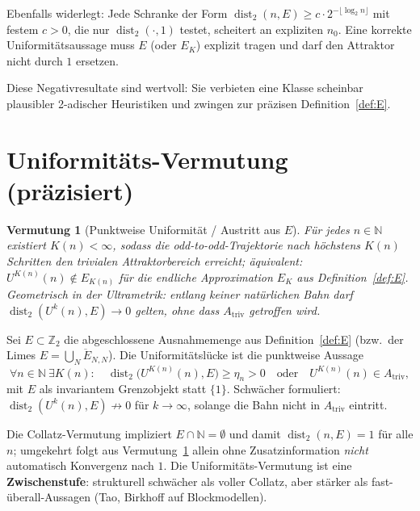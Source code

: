 \documentclass[12pt,a4paper]{article}
\newtheorem{vermutung}[satz]{Vermutung}
\newcommand{\N}{\mathbb{N}}
\newcommand{\Ztwo}{\mathbb{Z}_2}
\newcommand{\disttwo}{\operatorname{dist}_2}
\begin{document}
\begin{tcolorbox}[bewiesen,title={Widerlegte $c\cdot 2^{-\log n}$-Form}]
Ebenfalls widerlegt: Jede Schranke der Form
$\disttwo(n,E)\geq c\cdot 2^{-\lfloor\log_2 n\rfloor}$ mit festem $c>0$,
die nur $\disttwo(\cdot,1)$ testet, scheitert an expliziten $n_0$.
Eine korrekte Uniformit\"atsaussage muss $E$ (oder $E_K$) explizit tragen
und darf den Attraktor nicht durch $1$ ersetzen.
\end{tcolorbox}

Diese Negativresultate sind wertvoll: Sie verbieten eine Klasse scheinbar
plausibler 2-adischer Heuristiken und zwingen zur pr\"azisen Definition~\ref{def:E}.

\section{Uniformit\"ats-Vermutung (pr\"azisiert)}
\label{sec:uniform}

\begin{vermutung}[Punktweise Uniformit\"at / Austritt aus $E$]
\label{verm:uniform}
F\"ur jedes $n\in\N$ existiert $K(n)<\infty$, sodass die odd-to-odd-Trajektorie
nach h\"ochstens $K(n)$ Schritten den trivialen Attraktorbereich erreicht;
\"aquivalent: $U^{K(n)}(n)\notin E_{K(n)}$ f\"ur die endliche Approximation
$E_K$ aus Definition~\ref{def:E}.
Geometrisch in der Ultrametrik: entlang keiner nat\"urlichen Bahn darf
$\disttwo(U^k(n),E)\to 0$ gelten, ohne dass $A_{\mathrm{triv}}$ getroffen wird.
\end{vermutung}

\begin{tcolorbox}[offen,title={Pr\"azise offene Frage (geometrisch)}]
Sei $E\subset\Ztwo$ die abgeschlossene Ausnahmemenge aus Definition~\ref{def:E}
(bzw.\ der Limes $E=\overline{\bigcup_N E_{N,N}}$).
Die Uniformit\"atsl\"ucke ist die punktweise Aussage
\[
  \forall n\in\N\ \exists K(n):\quad
  \disttwo\bigl(U^{K(n)}(n),E\bigr)\geq\eta_n>0
  \quad\text{oder}\quad
  U^{K(n)}(n)\in A_{\mathrm{triv}},
\]
mit $E$ als invariantem Grenzobjekt statt $\{1\}$.
Schw\"acher formuliert: $\disttwo(U^k(n),E)\not\to 0$ f\"ur $k\to\infty$,
solange die Bahn nicht in $A_{\mathrm{triv}}$ eintritt.
\end{tcolorbox}

\begin{tcolorbox}[kern]
Die Collatz-Vermutung impliziert $E\cap\N=\emptyset$ und damit
$\disttwo(n,E)=1$ f\"ur alle $n$; umgekehrt folgt aus Vermutung~\ref{verm:uniform}
allein ohne Zusatzinformation \emph{nicht} automatisch Konvergenz nach $1$.
Die Uniformit\"ats-Vermutung ist eine \textbf{Zwischenstufe}: strukturell
schw\"acher als voller Collatz, aber st\"arker als fast-\"uberall-Aussagen
(Tao, Birkhoff auf Blockmodellen).
\end{tcolorbox}
\end{document}
